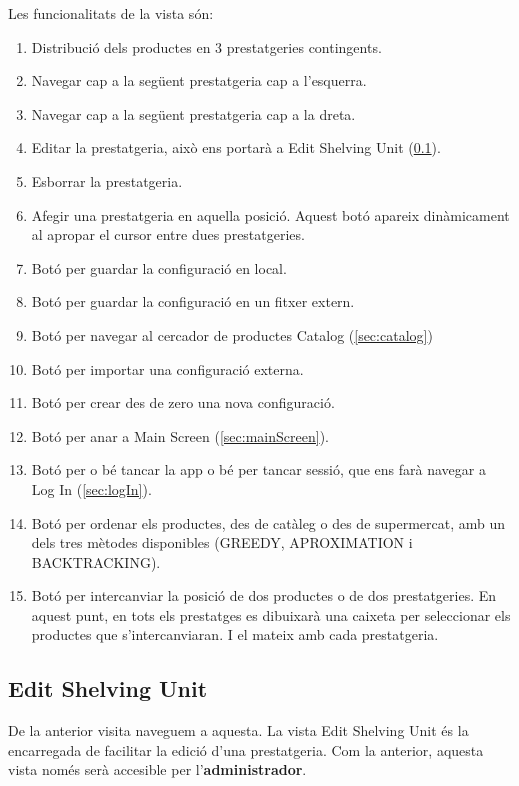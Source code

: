 \documentclass[a4paper,12pt]{article}
\begin{document}
	\noindent Les funcionalitats de la vista són:
	
	\begin{enumerate}[itemsep=0pt, topsep=0pt]
		\item Distribució dels productes en 3 prestatgeries contingents.
		\item Navegar cap a la següent prestatgeria cap a l'esquerra.
		\item Navegar cap a la següent prestatgeria cap a la dreta.
		\item Editar la prestatgeria, això ens portarà a Edit Shelving Unit (\ref{sec:editShelvingUnit}).
		\item Esborrar la prestatgeria.
		\item Afegir una prestatgeria en aquella posició. Aquest botó apareix dinàmicament al apropar el cursor entre dues prestatgeries.
		\item Botó per guardar la configuració en local.
		\item Botó per guardar la configuració en un fitxer extern.
		\item Botó per navegar al cercador de productes Catalog (\ref{sec:catalog})
		\item Botó per importar una configuració externa.
		\item Botó per crear des de zero una nova configuració.
		\item Botó per anar a Main Screen (\ref{sec:mainScreen}).
		\item Botó per o bé tancar la app o bé per tancar sessió, que ens farà navegar a Log In (\ref{sec:logIn}).
		\item Botó per ordenar els productes, des de catàleg o des de supermercat, amb un dels tres mètodes disponibles (GREEDY, APROXIMATION i BACKTRACKING).
		\item Botó per intercanviar la posició de dos productes o de dos prestatgeries. En aquest punt, en tots els prestatges es dibuixarà una caixeta per seleccionar els productes que s'intercanviaran. I el mateix amb cada prestatgeria.
	\end{enumerate}
	
	\newpage
	\subsection{Edit Shelving Unit}
	\label{sec:editShelvingUnit}
	
	De la anterior visita naveguem a aquesta. La vista Edit Shelving Unit és la encarregada de facilitar la edició d'una prestatgeria. Com la anterior, aquesta vista només serà accesible per l'\textbf{administrador}.
	
\end{document}
